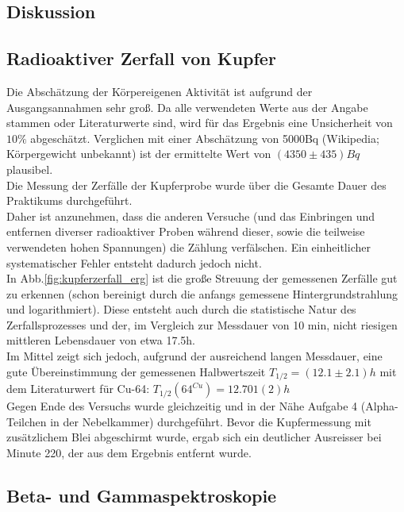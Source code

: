 \documentclass[12pt,a4paper]{article}
\begin{document}
\begin{multicols}{2}
\section{Diskussion}

\subsection{Radioaktiver Zerfall von Kupfer}
Die Abschätzung der Körpereigenen Aktivität ist aufgrund der Ausgangsannahmen sehr groß. Da alle verwendeten Werte aus der Angabe stammen oder Literaturwerte sind, wird für das Ergebnis eine Unsicherheit von $10\%$ abgeschätzt. Verglichen mit einer Abschätzung von 5000Bq (Wikipedia; Körpergewicht unbekannt) ist der ermittelte Wert von $(4350 \pm 435) Bq$ plausibel.\\

\noindent Die Messung der Zerfälle der Kupferprobe wurde über die Gesamte Dauer des Praktikums durchgeführt.\\
Daher ist anzunehmen, dass die anderen Versuche (und das Einbringen und entfernen diverser radioaktiver Proben während dieser, sowie die teilweise verwendeten hohen Spannungen) die Zählung verfälschen. Ein einheitlicher systematischer Fehler entsteht dadurch jedoch nicht.\\

\noindent In Abb.\ref{fig:kupferzerfall_erg} ist die große Streuung der gemessenen Zerfälle gut zu erkennen (schon bereinigt durch die anfangs gemessene Hintergrundstrahlung und logarithmiert). Diese entsteht auch durch die statistische Natur des Zerfallsprozesses und der, im Vergleich zur Messdauer von 10 min, nicht riesigen mittleren Lebensdauer von etwa 17.5h.\\

\noindent Im Mittel zeigt sich jedoch, aufgrund der ausreichend langen Messdauer, eine gute Übereinstimmung der gemessenen Halbwertszeit $T_{1/2} = (12.1 \pm 2.1)h$ mit dem
Literaturwert für Cu-64: $T_{1/2} ({64}^{Cu}) = 12.701(2) h$\\

\noindent Gegen Ende des Versuchs wurde gleichzeitig und in der Nähe Aufgabe 4 (Alpha-Teilchen in der Nebelkammer) durchgeführt. Bevor die Kupfermessung mit zusätzlichem Blei abgeschirmt wurde, ergab sich ein deutlicher Ausreisser bei Minute 220, der aus dem Ergebnis entfernt wurde.

\subsection{Beta- und Gammaspektroskopie}


\end{multicols}
\end{document}
